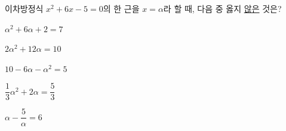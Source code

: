 이차방정식 $x^2+6x-5=0$의 한 근을 $x=\alpha$라 할 때, 다음 중 옳지 \underline{않은} 것은?
\begin{choicesii}{\rule[-3ex]{0pt}{8ex}$\alpha^2+6\alpha+2=7$}{\rule[-3ex]{0pt}{8ex}$2\alpha^2+12\alpha=10$}{\rule[-3ex]{0pt}{8ex}$10-6\alpha-\alpha^2=5$}{\rule[-3ex]{0pt}{8ex}$\dfrac{1}{3}\alpha^2+2\alpha=\dfrac{5}{3}$}{\rule[-3ex]{0pt}{8ex}$\alpha-\dfrac{5}{\alpha}=6$}\end{choicesii}
